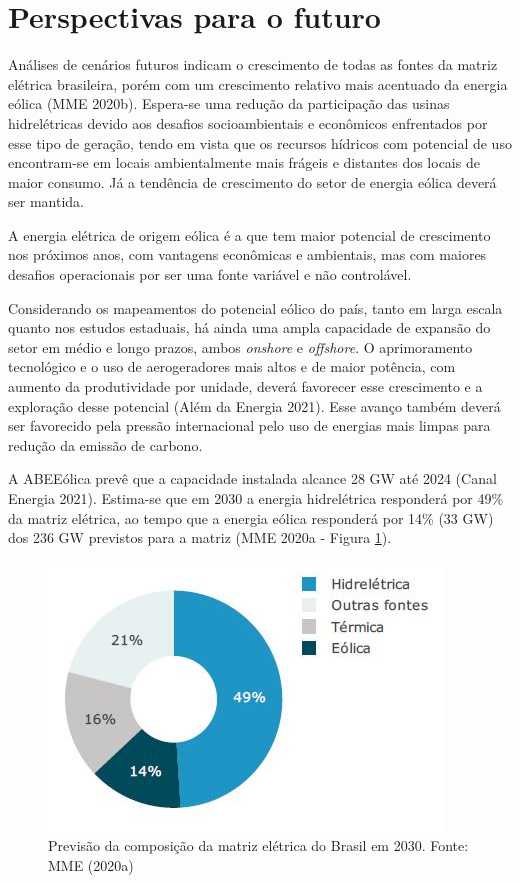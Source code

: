 \documentclass[
  oneside]{scrbook}
\begin{document}
\hypertarget{perspectivas-para-o-futuro}{%
\section{Perspectivas para o futuro}\label{perspectivas-para-o-futuro}}

Análises de cenários futuros indicam o crescimento de todas as fontes da matriz elétrica brasileira, porém com um crescimento relativo mais acentuado da energia eólica (MME 2020b). Espera-se uma redução da participação das usinas hidrelétricas devido aos desafios socioambientais e econômicos enfrentados por esse tipo de geração, tendo em vista que os recursos hídricos com potencial de uso encontram-se em locais ambientalmente mais frágeis e distantes dos locais de maior consumo. Já a tendência de crescimento do setor de energia eólica deverá ser mantida.

A energia elétrica de origem eólica é a que tem maior potencial de crescimento nos próximos anos, com vantagens econômicas e ambientais, mas com maiores desafios operacionais por ser uma fonte variável e não controlável.

Considerando os mapeamentos do potencial eólico do país, tanto em larga escala quanto nos estudos estaduais, há ainda uma ampla capacidade de expansão do setor em médio e longo prazos, ambos \emph{onshore} e \emph{offshore}. O aprimoramento tecnológico e o uso de aerogeradores mais altos e de maior potência, com aumento da produtividade por unidade, deverá favorecer esse crescimento e a exploração desse potencial (Além da Energia 2021). Esse avanço também deverá ser favorecido pela pressão internacional pelo uso de energias mais limpas para redução da emissão de carbono.

A ABEEólica prevê que a capacidade instalada alcance 28 GW até 2024 (Canal Energia 2021). Estima-se que em 2030 a energia hidrelétrica responderá por 49\% da matriz elétrica, ao tempo que a energia eólica responderá por 14\% (33 GW) dos 236 GW previstos para a matriz (MME 2020a - Figura \ref{fig:08}).

\begin{figure}[H]

{\centering \includegraphics[width=0.55\linewidth]{imagens/cap01/Figura_1.8} 

}

\caption{Previsão da composição da matriz elétrica do Brasil em 2030. Fonte: MME (2020a)}\label{fig:08}
\end{figure}
\end{document}

